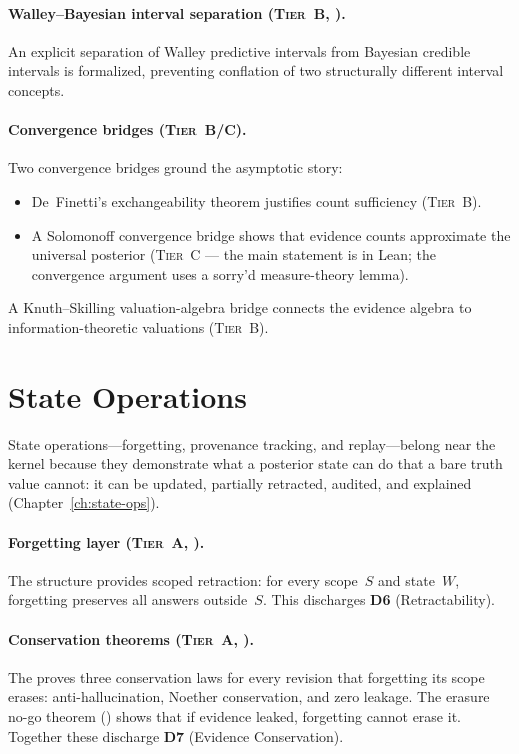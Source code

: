 \paragraph{Walley--Bayesian interval separation
  (\textsc{Tier~B}, \claimConditional{}).}
An explicit separation of Walley predictive intervals from Bayesian
credible intervals is formalized, preventing conflation of two
structurally different interval concepts.

\paragraph{Convergence bridges (\textsc{Tier~B/C}).}
Two convergence bridges ground the asymptotic story:
\begin{itemize}
\item De~Finetti's exchangeability theorem justifies count sufficiency
  (\textsc{Tier~B}).
\item A Solomonoff convergence bridge shows that evidence counts
  approximate the universal posterior (\textsc{Tier~C} --- the main
  statement is in Lean; the convergence argument uses a sorry'd
  measure-theory lemma).
\end{itemize}
A Knuth--Skilling valuation-algebra bridge connects the evidence algebra
to information-theoretic valuations (\textsc{Tier~B}).


\section{State Operations}
\label{sec:covers-state-ops}

State operations---forgetting, provenance tracking, and replay---belong
near the kernel because they demonstrate what a posterior state can do
that a bare truth value cannot: it can be updated, partially retracted,
audited, and explained (Chapter~\ref{ch:state-ops}).

\paragraph{Forgetting layer (\textsc{Tier~A}, \claimCore{}).}
The  structure provides scoped retraction: for
every scope~$S$ and state~$W$, forgetting preserves all answers
outside~$S$.  This discharges \textbf{D6} (Retractability).

\paragraph{Conservation theorems (\textsc{Tier~A}, \claimCore{}).}
The  proves three conservation laws for
every revision that forgetting its scope erases: anti-hallucination,
Noether conservation, and zero leakage.  The erasure no-go theorem
(\claimBoundary{}) shows that if evidence leaked, forgetting cannot erase
it.  Together
these discharge \textbf{D7} (Evidence Conservation).

